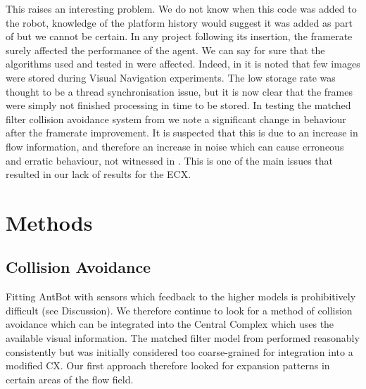\documentclass[a4paper,11pt,twoside,openright]{article}
\let\oldsection\section
\def\section{\cleardoublepage\oldsection}
\begin{document}
This raises an interesting problem. We do not know when this code was
added to the robot, knowledge of the platform history would suggest it
was added as part of \cite{Scimeca2017} but we cannot be certain.  In
any project following its insertion, the framerate surely affected the
performance of the agent. We can say for sure that the algorithms used
and tested in \cite{Mitchell2018} were affected. Indeed, in
\cite{Mitchell2018} it is noted that few images were stored during
Visual Navigation experiments. The low storage rate was thought to be
a thread synchronisation issue, but it is now clear that the frames
were simply not finished processing in time to be stored.  In testing
the matched filter collision avoidance system from \cite{Mitchell2018}
we note a significant change in behaviour after the framerate
improvement. It is suspected that this is due to an increase in flow
information, and therefore an increase in noise which can cause
erroneous and erratic behaviour, not witnessed in \cite{Mitchell2018}.
This is one of the main issues that resulted in our lack of results
for the ECX.
\newpage

\section{ Methods } \label{sec:methods}
\subsection{ Collision Avoidance }
Fitting AntBot with sensors which feedback to the higher models is
prohibitively difficult (see Discussion). We therefore continue to
look for a method of collision avoidance which can be integrated into
the Central Complex which uses the available visual information. The
matched filter model from \cite{Mitchell2018} performed reasonably
consistently but was initially considered too coarse-grained for
integration into a modified CX. Our first approach therefore looked
for expansion patterns in certain areas of the flow field.
\end{document}
